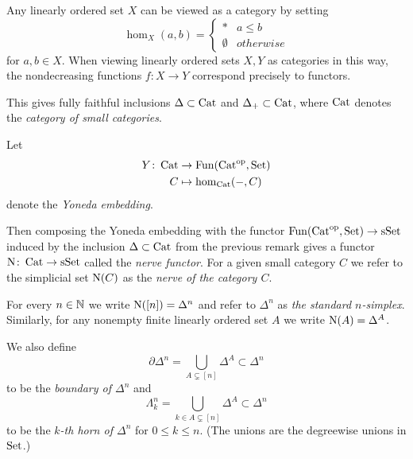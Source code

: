 \begin{remark}
    Any linearly ordered set $X$ can be viewed as a category by setting
    \begin{equation*}
        \hom_{X}(a,b)=\begin{cases}
            * & a\leq b\\
            \emptyset & otherwise
        \end{cases}
    \end{equation*}
    for $a,b\in X$.
    When viewing linearly ordered sets $X,Y$ as categories in this way, the nondecreasing functions $f\colon X\to Y$ correspond precisely to functors.

    This gives fully faithful inclusions $\Delta\subset\operatorname{Cat}$ and $\Delta_+\subset\operatorname{Cat}$, where $\operatorname{Cat}$ denotes the \emph{category of small categories}.
\end{remark}
\begin{definition} %
    Let
    \begin{align*}
        Y\colon\operatorname{Cat}&\to\operatorname{Fun}(\operatorname{Cat}^{\operatorname{op}},\operatorname{Set})\\
        C&\mapsto\hom_{\operatorname{Cat}}(-,C)
    \end{align*}
    denote the \emph{Yoneda embedding}.

    Then composing the Yoneda embedding with the functor $\operatorname{Fun}(\operatorname{Cat}^{\operatorname{op}},\operatorname{Set})\to\operatorname{sSet}$ induced by the inclusion $\Delta\subset\operatorname{Cat}$ from the previous remark gives a functor $\operatorname{N}\colon\operatorname{Cat}\to\operatorname{sSet}$ called the \emph{nerve functor}.
    For a given small category $C$ we refer to the simplicial set $\operatorname{N}(C)$ as the \emph{nerve of the category $C$}.
\end{definition}
\begin{definition}
    For every $n\in\mathbb{N}$ we write $\operatorname{N}([n])=\Delta^n$ and refer to $\Delta^n$ as \emph{the standard $n$-simplex}.
    Similarly, for any nonempty finite linearly ordered set $A$ we write $\operatorname{N}(A)=\Delta^A$.

    We also define 
    \begin{equation*}
        \partial\Delta^n=\bigcup\limits_{A\subsetneq[n]}\Delta^A\subset\Delta^n
    \end{equation*}
    to be the \emph{boundary of $\Delta^n$} and 
    \begin{equation*}
        \Lambda_k^n=\bigcup\limits_{k\in A\subsetneq[n]}\Delta^A\subset\Delta^n
    \end{equation*}
    to be the \emph{$k$-th horn of $\Delta^n$} for $0\leq k\leq n$.
    (The unions are the degreewise unions in $\operatorname{Set}$.) %
\end{definition}
